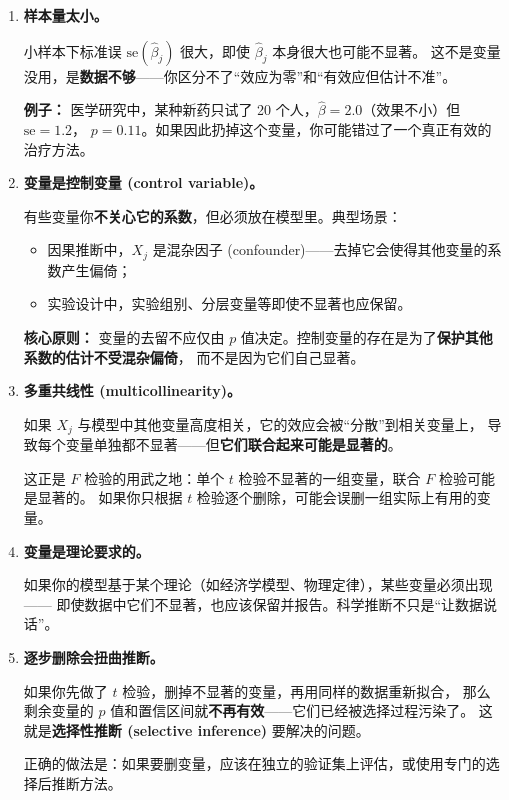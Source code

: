 \begin{enumerate}[label=(\arabic*)]
    \item \textbf{样本量太小。}
    
    小样本下标准误 $\mathrm{se}(\hat{\beta}_j)$ 很大，即使 $\hat{\beta}_j$ 本身很大也可能不显著。
    这不是变量没用，是\textbf{数据不够}——你区分不了``效应为零''和``有效应但估计不准''。
    
    \textbf{例子：} 医学研究中，某种新药只试了 20 个人，$\hat{\beta} = 2.0$（效果不小）但 $\mathrm{se} = 1.2$，
    $p = 0.11$。如果因此扔掉这个变量，你可能错过了一个真正有效的治疗方法。

    \item \textbf{变量是控制变量 (control variable)。}
    
    有些变量你\textbf{不关心它的系数}，但必须放在模型里。典型场景：
    \begin{itemize}
        \item 因果推断中，$X_j$ 是混杂因子 (confounder)——去掉它会使得其他变量的系数产生偏倚；
        \item 实验设计中，实验组别、分层变量等即使不显著也应保留。
    \end{itemize}
    
    \textbf{核心原则：} 变量的去留不应仅由 $p$ 值决定。控制变量的存在是为了\textbf{保护其他系数的估计不受混杂偏倚}，
    而不是因为它们自己显著。

    \item \textbf{多重共线性 (multicollinearity)。}
    
    如果 $X_j$ 与模型中其他变量高度相关，它的效应会被``分散''到相关变量上，
    导致每个变量单独都不显著——但\textbf{它们联合起来可能是显著的}。
    
    这正是 $F$ 检验的用武之地：单个 $t$ 检验不显著的一组变量，联合 $F$ 检验可能是显著的。
    如果你只根据 $t$ 检验逐个删除，可能会误删一组实际上有用的变量。

    \item \textbf{变量是理论要求的。}
    
    如果你的模型基于某个理论（如经济学模型、物理定律），某些变量必须出现——
    即使数据中它们不显著，也应该保留并报告。科学推断不只是``让数据说话''。

    \item \textbf{逐步删除会扭曲推断。}
    
    如果你先做了 $t$ 检验，删掉不显著的变量，再用同样的数据重新拟合，
    那么剩余变量的 $p$ 值和置信区间就\textbf{不再有效}——它们已经被选择过程污染了。
    这就是\textbf{选择性推断 (selective inference)} 要解决的问题。
    
    正确的做法是：如果要删变量，应该在独立的验证集上评估，或使用专门的选择后推断方法。
\end{enumerate}

